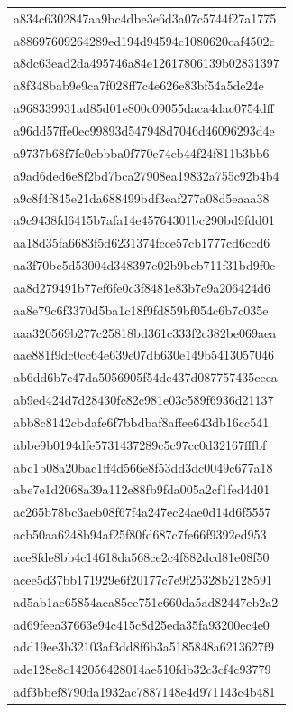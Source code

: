 \begin{tabular}{l}
a834c6302847aa9bc4dbe3e6d3a07c5744f27a1775 \\
a88697609264289ed194d94594c1080620caf4502c \\
a8dc63ead2da495746a84e12617806139b02831397 \\
a8f348bab9e9ca7f028ff7c4e626e83bf54a5de24e \\
a968339931ad85d01e800c09055daca4dac0754dff \\
a96dd57ffe0ec99893d547948d7046d46096293d4e \\
a9737b68f7fe0ebbba0f770e74eb44f24f811b3bb6 \\
a9ad6ded6e8f2bd7bca27908ea19832a755c92b4b4 \\
a9c8f4f845e21da688499bdf3eaf277a08d5eaaa38 \\
a9c9438fd6415b7afa14e45764301bc290bd9fdd01 \\
aa18d35fa6683f5d6231374fcce57cb1777cd6ccd6 \\
aa3f70be5d53004d348397e02b9beb711f31bd9f0c \\
aa8d279491b77ef6fe0c3f8481e83b7e9a206424d6 \\
aa8e79c6f3370d5ba1c18f9fd859bf054c6b7c035e \\
aaa320569b277c25818bd361c333f2c382be069aea \\
aae881f9dc0cc64e639e07db630e149b5413057046 \\
ab6dd6b7e47da5056905f54de437d087757435ceea \\
ab9ed424d7d28430fc82c981e03c589f6936d21137 \\
abb8c8142cbdafe6f7bbdbaf8affee643db16cc541 \\
abbe9b0194dfe5731437289c5c97cc0d32167fffbf \\
abc1b08a20bac1ff4d566e8f53dd3dc0049c677a18 \\
abe7e1d2068a39a112e88fb9fda005a2cf1fed4d01 \\
ac265b78bc3aeb08f67f4a247ec24ae0d14d6f5557 \\
acb50aa6248b94af25f80fd687c7fe66f9392ed953 \\
ace8fde8bb4c14618da568ce2c4f882dcd81e08f50 \\
acee5d37bb171929e6f20177c7e9f25328b2128591 \\
ad5ab1ae65854aca85ee751c660da5ad82447eb2a2 \\
ad69feea37663e94c415c8d25eda35fa93200ec4e0 \\
add19ee3b32103af3dd8f6b3a5185848a6213627f9 \\
ade128e8c142056428014ae510fdb32c3cf4c93779 \\
adf3bbef8790da1932ac7887148e4d971143c4b481 \\

\end{tabular}
